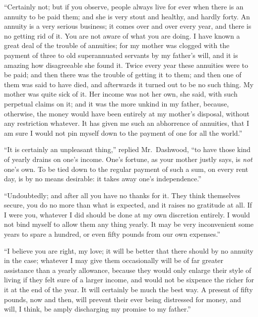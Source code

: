 \documentclass{article}
\begin{document}
``Certainly not; but if you observe, people always
live for ever when there is an annuity to be paid them;
and she is very stout and healthy, and hardly forty.
An annuity is a very serious business; it comes over
and over every year, and there is no getting rid
of it.  You are not aware of what you are doing.
I have known a great deal of the trouble of annuities;
for my mother was clogged with the payment of three
to old superannuated servants by my father's will,
and it is amazing how disagreeable she found it.
Twice every year these annuities were to be paid; and then
there was the trouble of getting it to them; and then one
of them was said to have died, and afterwards it turned
out to be no such thing.  My mother was quite sick of it.
Her income was not her own, she said, with such perpetual
claims on it; and it was the more unkind in my father,
because, otherwise, the money would have been entirely at
my mother's disposal, without any restriction whatever.
It has given me such an abhorrence of annuities, that I am
sure I would not pin myself down to the payment of one for
all the world.''

``It is certainly an unpleasant thing,'' replied Mr.\ Dashwood,
``to have those kind of yearly drains on one's income.
One's fortune, as your mother justly says, is \emph{not} one's own.
To be tied down to the regular payment of such a sum,
on every rent day, is by no means desirable: it takes away
one's independence.''

``Undoubtedly; and after all you have no thanks for it.
They think themselves secure, you do no more than what
is expected, and it raises no gratitude at all.  If I were you,
whatever I did should be done at my own discretion entirely.
I would not bind myself to allow them any thing yearly.
It may be very inconvenient some years to spare a hundred,
or even fifty pounds from our own expenses.''

``I believe you are right, my love; it will be better
that there should by no annuity in the case; whatever I
may give them occasionally will be of far greater assistance
than a yearly allowance, because they would only enlarge
their style of living if they felt sure of a larger income,
and would not be sixpence the richer for it at the end
of the year.  It will certainly be much the best way.
A present of fifty pounds, now and then, will prevent
their ever being distressed for money, and will, I think,
be amply discharging my promise to my father.''
\end{document}
